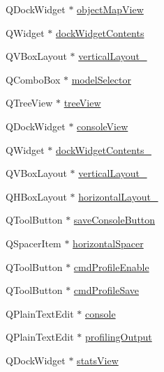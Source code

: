 \begin{DoxyCompactItemize}
Q\+Dock\+Widget $\ast$ \mbox{\hyperlink{class_ui___main_window_a8cd77048de93113c81ea298608a7d597}{object\+Map\+View}}
\item 
Q\+Widget $\ast$ \mbox{\hyperlink{class_ui___main_window_a765ded8236736213d556f6f91941808e}{dock\+Widget\+Contents}}
\item 
Q\+V\+Box\+Layout $\ast$ \mbox{\hyperlink{class_ui___main_window_a6f40fc110b15410c00837a446d57bdbe}{vertical\+Layout\+\_}}
\item 
Q\+Combo\+Box $\ast$ \mbox{\hyperlink{class_ui___main_window_aa0c1c4048c8c42cbc2d2fdc3852180b5}{model\+Selector}}
\item 
Q\+Tree\+View $\ast$ \mbox{\hyperlink{class_ui___main_window_a2e917678fb1e644071b85bf38d97125e}{tree\+View}}
\item 
Q\+Dock\+Widget $\ast$ \mbox{\hyperlink{class_ui___main_window_a390959d0424a38dcb41e84407c35edce}{console\+View}}
\item 
Q\+Widget $\ast$ \mbox{\hyperlink{class_ui___main_window_aa582921b029b95e76e2a4ca8f1442ae9}{dock\+Widget\+Contents\+\_}}
\item 
Q\+V\+Box\+Layout $\ast$ \mbox{\hyperlink{class_ui___main_window_a0c01bad60d9f422a1258e710635a2f65}{vertical\+Layout\+\_}}
\item 
Q\+H\+Box\+Layout $\ast$ \mbox{\hyperlink{class_ui___main_window_a80867018070156432923d0266cc9fe25}{horizontal\+Layout\+\_}}
\item 
Q\+Tool\+Button $\ast$ \mbox{\hyperlink{class_ui___main_window_a76866a197499bec3c761d168a7ab6bac}{save\+Console\+Button}}
\item 
Q\+Spacer\+Item $\ast$ \mbox{\hyperlink{class_ui___main_window_a7871ea8c4b6c595d7ccd53960b344719}{horizontal\+Spacer}}
\item 
Q\+Tool\+Button $\ast$ \mbox{\hyperlink{class_ui___main_window_a6186171df552e90ad1ead20576a8d31c}{cmd\+Profile\+Enable}}
\item 
Q\+Tool\+Button $\ast$ \mbox{\hyperlink{class_ui___main_window_ad2fe0660da822a42cf8529128537993c}{cmd\+Profile\+Save}}
\item 
Q\+Plain\+Text\+Edit $\ast$ \mbox{\hyperlink{class_ui___main_window_a943c70d7e071f72e4255e90c9c2472e3}{console}}
\item 
Q\+Plain\+Text\+Edit $\ast$ \mbox{\hyperlink{class_ui___main_window_aab7dff81ac2d41b8fbd31784fac8c57d}{profiling\+Output}}
\item 
Q\+Dock\+Widget $\ast$ \mbox{\hyperlink{class_ui___main_window_aeb9cec1bb3f3765f79d4a882a97744f3}{stats\+View}}

\end{DoxyCompactItemize}
